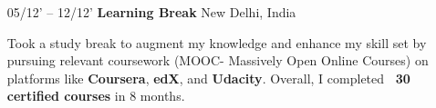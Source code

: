 \documentclass{article}
\begin{document}
\begin{itemize}[leftmargin=-1ex] \setlength\itemsep{0.25em}
    \item[05/12' – 12/12'] \textbf{Learning Break} \hfill New Delhi, India
   \item[] Took a study break to augment my knowledge and enhance my skill set by pursuing relevant coursework (MOOC- Massively Open Online Courses) on platforms like \textbf{Coursera}, \textbf{edX}, and \textbf{Udacity}. Overall, I completed \textbf{~30 certified courses} in 8 months.
\end{itemize}

\end{document}
